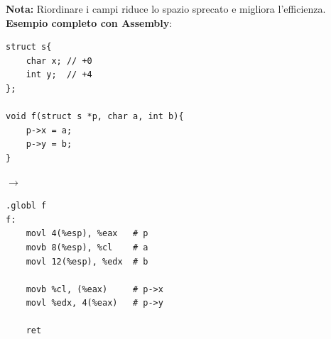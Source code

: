\medskip
\noindent\textbf{Nota:} Riordinare i campi riduce lo spazio sprecato e migliora l'efficienza.\\
\noindent\textbf{Esempio completo con Assembly}: \medskip\\
\begin{minipage}{0.4\textwidth}
\begin{verbatim}
struct s{
    char x; // +0
    int y;  // +4
};

void f(struct s *p, char a, int b){
    p->x = a;
    p->y = b;
}
\end{verbatim}
\end{minipage}
\hfill
$\longrightarrow$
\hfill
\begin{minipage}{0.4\textwidth}
\begin{verbatim}
.globl f
f:
    movl 4(%esp), %eax   # p
    movb 8(%esp), %cl    # a
    movl 12(%esp), %edx  # b

    movb %cl, (%eax)     # p->x
    movl %edx, 4(%eax)   # p->y

    ret
\end{verbatim}
\end{minipage}
\newpage
